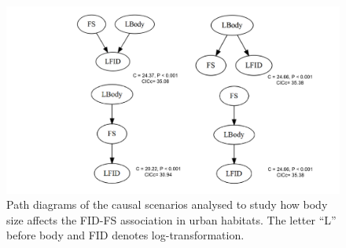 \begin{figure}
\includegraphics[width=\textwidth]{./Figures/Appendix4_1/Fig_3.png}
\caption[Path analysis with body size for urban habitats]{
Path diagrams of the causal scenarios analysed to study how body size affects
the FID-FS association in urban habitats. The letter “L” before body and
FID denotes log-transformation.}\label{fig:figApp4.3}
\end{figure}
